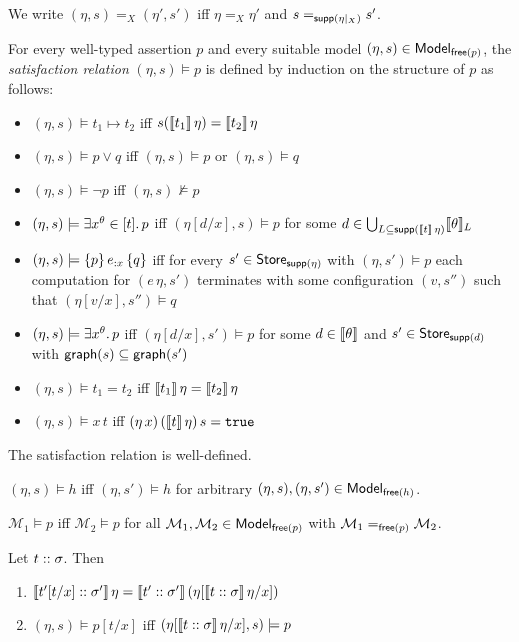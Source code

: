 \documentclass[12pt,a4paper]{report}
\begin{document}
We write $(\eta,s) =_X (\eta',s')$ iff $\eta =_X \eta'$ and $s =_{\mathsf{supp}(\eta|_X)} s'$.

\begin{definition}
  For every well-typed assertion $p$ and every suitable model $(\eta,s) \in \mathsf{Model}_{\mathsf{free}(p)}$,
  the {\em satisfaction relation} $(\eta,s) \models p$ is defined by induction on the structure of $p$ as follows:
  \begin{itemize}
    \item $(\eta,s) \models t_1 \mapsto t_2$ iff $s(\llbracket t_1\rrbracket\,\eta) = \llbracket t_2\rrbracket\,\eta$
    \item $(\eta,s) \models p \vee q$ iff $(\eta,s) \models p$ or $(\eta,s) \models q$
    \item $(\eta,s) \models \neg p$ iff $(\eta,s) \not\models p$
    \item $(\eta,s) \models \exists{x^\theta}\in{[t]}.\,{p}$ iff $(\eta[d/x],s) \models p$ for some
          $d \in \bigcup_{L\subseteq\mathsf{supp}(\llbracket t\rrbracket\,\eta)}\llbracket\theta\rrbracket_L$
    \item $(\eta,s) \models \{p\}\,e_{:x}\,\{q\}$ iff for every $s' \in \mathsf{Store}_{\mathsf{supp}(\eta)}$ with
          $(\eta,s') \models p$ each computation for $(e\,\eta,s')$ terminates with some
          configuration $(v,s'')$ such that $(\eta[v/x],s'')\models q$
    \item $(\eta,s) \models \exists{x^\theta}.\,{p}$ iff $(\eta[d/x],s') \models p$ for some $d \in \llbracket\theta\rrbracket$ and
          $s' \in \mathsf{Store}_{\mathsf{supp}(d)}$ with $\mathsf{graph}(s) \subseteq \mathsf{graph}(s')$
    \item $(\eta,s) \models t_1 = t_2$ iff $\llbracket t_1\rrbracket\,\eta = \llbracket t_2\rrbracket\,\eta$
    \item $(\eta,s) \models x\,t$ iff $(\eta\,x)\,(\llbracket t\rrbracket\,\eta)\,s = \mathtt{true}$
  \end{itemize}
\end{definition}

\begin{lemma}
  The satisfaction relation is well-defined.
\end{lemma}

\begin{lemma}
  $(\eta,s) \models h$ iff $(\eta,s') \models h$ for arbitrary $(\eta,s),(\eta,s')\in\mathsf{Model}_{\mathsf{free}(h)}$.
\end{lemma}

\begin{lemma}[Coincidence]
  $\mathcal{M}_1 \models p$ iff $\mathcal{M}_2 \models p$ for all $\mathcal{M}_1,\mathcal{M}_2\in\mathsf{Model}_{\mathsf{free}(p)}$
  with $\mathcal{M}_1 =_{\mathsf{free}(p)} \mathcal{M}_2$.
\end{lemma}

\begin{lemma}[Substitution]
  Let ${t}\mathrel{::}{\sigma}$. Then
  \begin{enumerate}
    \item $\llbracket{t'[t/x]}\mathrel{::}{\sigma'}\rrbracket\,\eta
           = \llbracket{t'}\mathrel{::}{\sigma'}\rrbracket\,(\eta[\llbracket{t}\mathrel{::}{\sigma}\rrbracket\,\eta/x])$
    \item $(\eta,s) \models p[t/x]$ iff $(\eta[\llbracket{t}\mathrel{::}{\sigma}\rrbracket\,\eta/x],s) \models p$
  \end{enumerate}
\end{lemma}
\end{document}
